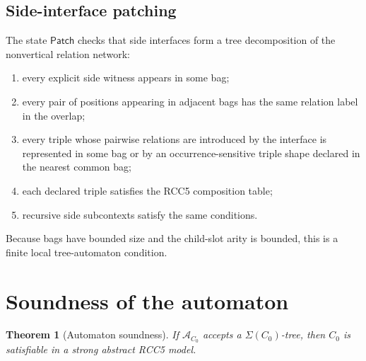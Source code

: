 \documentclass[11pt]{article}
\newtheorem{theorem}{Theorem}[section]
\newcommand{\Aut}{\mathcal A}
\begin{document}
\subsection{Side-interface patching}

The state $\mathsf{Patch}$ checks that side interfaces form a tree decomposition of the nonvertical relation network:
\begin{enumerate}[label=(S\arabic*)]
\item every explicit side witness appears in some bag;
\item every pair of positions appearing in adjacent bags has the same relation label in the overlap;
\item every triple whose pairwise relations are introduced by the interface is represented in some bag or by an occurrence-sensitive triple shape declared in the nearest common bag;
\item each declared triple satisfies the RCC5 composition table;
\item recursive side subcontexts satisfy the same conditions.
\end{enumerate}
Because bags have bounded size and the child-slot arity is bounded, this is a finite local tree-automaton condition.

\section{Soundness of the automaton}

\begin{theorem}[Automaton soundness]\label{thm:sound}
If $\Aut_{C_0}$ accepts a $\Sigma(C_0)$-tree, then $C_0$ is satisfiable in a strong abstract RCC5 model.
\end{theorem}
\end{document}
